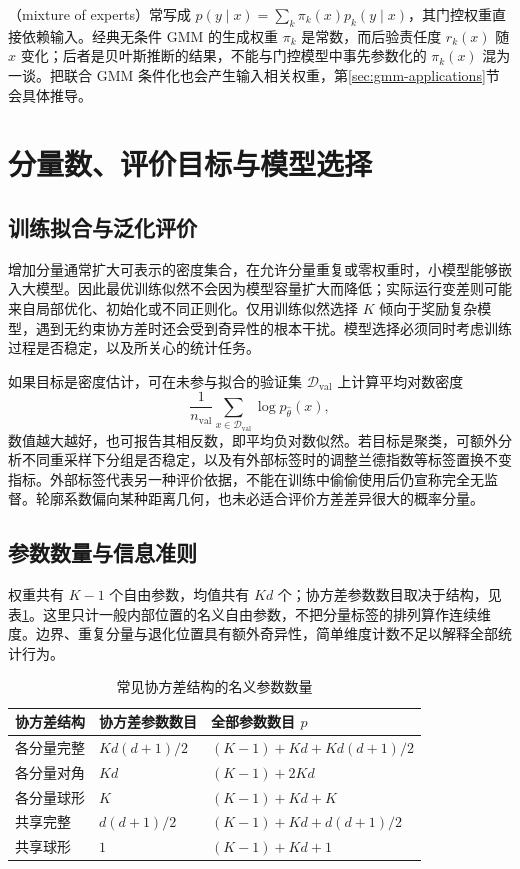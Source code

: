 \documentclass[UTF8]{ctexart}
\begin{document}
（mixture of experts）常写成 $p(y\mid x)=\sum_k\pi_k(x)p_k(y\mid x)$，其门控权重直接依赖输入。经典无条件 GMM 的生成权重 $\pi_k$ 是常数，而后验责任度 $r_k(x)$ 随 $x$ 变化；后者是贝叶斯推断的结果，不能与门控模型中事先参数化的 $\pi_k(x)$ 混为一谈。把联合 GMM 条件化也会产生输入相关权重，第\ref{sec:gmm-applications}节会具体推导。

\section{分量数、评价目标与模型选择}
\label{sec:gmm-model-selection}

\subsection{训练拟合与泛化评价}
增加分量通常扩大可表示的密度集合，在允许分量重复或零权重时，小模型能够嵌入大模型。因此最优训练似然不会因为模型容量扩大而降低；实际运行变差则可能来自局部优化、初始化或不同正则化。仅用训练似然选择 $K$ 倾向于奖励复杂模型，遇到无约束协方差时还会受到奇异性的根本干扰。模型选择必须同时考虑训练过程是否稳定，以及所关心的统计任务。

如果目标是密度估计，可在未参与拟合的验证集 $\mathcal D_{\mathrm{val}}$ 上计算平均对数密度
\[
\frac1{n_{\mathrm{val}}}\sum_{x\in\mathcal D_{\mathrm{val}}}\log p_{\widehat\theta}(x),
\]
数值越大越好，也可报告其相反数，即平均负对数似然。若目标是聚类，可额外分析不同重采样下分组是否稳定，以及有外部标签时的调整兰德指数等标签置换不变指标。外部标签代表另一种评价依据，不能在训练中偷偷使用后仍宣称完全无监督。轮廓系数偏向某种距离几何，也未必适合评价方差差异很大的概率分量。

\subsection{参数数量与信息准则}
权重共有 $K-1$ 个自由参数，均值共有 $Kd$ 个；协方差参数数目取决于结构，见表\ref{tab:gmm-parameter-count}。这里只计一般内部位置的名义自由参数，不把分量标签的排列算作连续维度。边界、重复分量与退化位置具有额外奇异性，简单维度计数不足以解释全部统计行为。
\begin{table}[htbp]
\centering
\caption{常见协方差结构的名义参数数量}
\label{tab:gmm-parameter-count}
\begin{tabular}{lll}
\toprule
协方差结构 & 协方差参数数目 & 全部参数数目 $p$\\
\midrule
各分量完整 & $Kd(d+1)/2$ & $(K-1)+Kd+Kd(d+1)/2$\\
各分量对角 & $Kd$ & $(K-1)+2Kd$\\
各分量球形 & $K$ & $(K-1)+Kd+K$\\
共享完整 & $d(d+1)/2$ & $(K-1)+Kd+d(d+1)/2$\\
共享球形 & $1$ & $(K-1)+Kd+1$\\
\bottomrule
\end{tabular}
\end{table}
\end{document}
